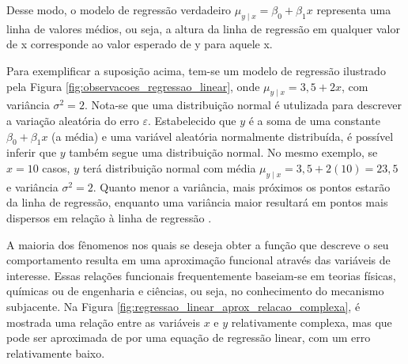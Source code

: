 Desse modo, o modelo de regressão verdadeiro $\mu_{y \mid x} = \beta_0 + \beta_1x$ representa uma linha de valores médios, ou seja, a altura da linha de regressão em qualquer valor de x corresponde ao valor esperado de y para aquele x.

Para exemplificar a suposição acima, tem-se um modelo de regressão ilustrado pela Figura \ref{fig:observacoes_regressao_linear}, onde $\mu_{y \mid x} = 3,5 + 2x$, com variância $\sigma^2 = 2$. Nota-se que uma distribuição normal é utulizada para descrever a variação aleatória do erro $\varepsilon$. Estabelecido que $y$ é a soma de uma constante $\beta_0 + \beta_1x$ (a média) e uma variável aleatória normalmente distribuída, é possível inferir que $y$ também segue uma distribuição normal. No mesmo exemplo, se $x = 10$ casos, $y$ terá distribuição normal com média $\mu_{y \mid x} = 3,5 + 2(10) = 23,5$ e variância $\sigma^2 = 2$. Quanto menor a variância, mais próximos os pontos estarão da linha de regressão, enquanto uma variância maior resultará em pontos mais dispersos em relação à linha de regressão \cite{montgomery2012}.

A maioria dos fênomenos nos quais se deseja obter a função que descreve o seu comportamento resulta em uma aproximação funcional através das variáveis de interesse. Essas relações funcionais frequentemente baseiam-se em teorias físicas, químicas ou de engenharia e ciências, ou seja, no conhecimento do mecanismo subjacente. Na Figura \ref{fig:regressao_linear_aprox_relacao_complexa}, é mostrada uma relação entre as variáveis $x$ e $y$ relativamente complexa, mas que pode ser aproximada de por uma equação de regressão linear, com um erro relativamente baixo.

